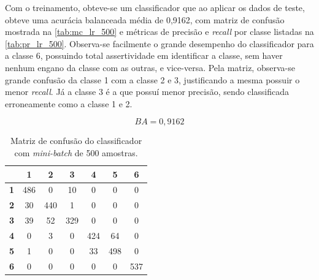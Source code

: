 Com o treinamento, obteve-se um classificador que ao aplicar os dados de teste, obteve uma acurácia balanceada média de 0,9162, com matriz de confusão mostrada na \autoref{tab:mc_lr_500} e métricas de precisão e \textit{recall} por classe listadas na \autoref{tab:pr_lr_500}. Observa-se facilmente o grande desempenho do classificador para a classe 6, possuindo total assertividade em identificar a classe, sem haver nenhum engano da classe com as outras, e vice-versa. Pela matriz, observa-se grande confusão da classe 1 com a classe 2 e 3, justificando a mesma possuir o menor \textit{recall}. Já a classe 3 é a que possuí menor precisão, sendo classificada erroneamente como a classe 1 e 2.

\begin{equation}\label{eq:ba_lr_500}
	BA = 0,9162
\end{equation}

\begin{table}[H]
	\centering
\begin{tabular}{c||c|c|c|c|c|c|}
	\cline{2-7}
	& \textbf{1} & \textbf{2} & \textbf{3} & \textbf{4} & \textbf{5} & \textbf{6} \\ \hline \hline
	\multicolumn{1}{|c||}{\textbf{1}} & 486        & 0          & 10         & 0          & 0          & 0          \\ \hline
	\multicolumn{1}{|c||}{\textbf{2}} & 30         & 440        & 1          & 0          & 0          & 0          \\ \hline
	\multicolumn{1}{|c||}{\textbf{3}} & 39         & 52         & 329        & 0          & 0          & 0          \\ \hline
	\multicolumn{1}{|c||}{\textbf{4}} & 0          & 3          & 0          & 424        & 64         & 0          \\ \hline
	\multicolumn{1}{|c||}{\textbf{5}} & 1          & 0          & 0          & 33         & 498        & 0          \\ \hline
	\multicolumn{1}{|c||}{\textbf{6}} & 0          & 0          & 0          & 0          & 0          & 537        \\ \hline
\end{tabular}
	\caption{Matriz de confusão do classificador com \textit{mini-batch} de 500 amostras.}
	\label{tab:mc_lr_500}
\end{table}

